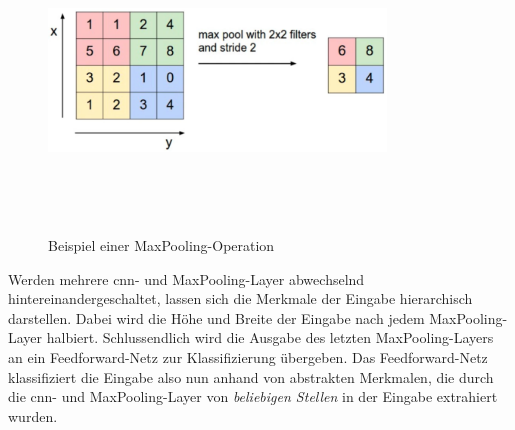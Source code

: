 \begin{figure}[h]
    \centering
    \includegraphics[width=0.8\textwidth,height=8cm,keepaspectratio=true]{content/images/MaxPooling.png}
    \caption{Beispiel einer MaxPooling-Operation \cite{6S191CNN}}
    \label{fig:MaxPooling}
\end{figure}

Werden mehrere \acrshort{cnn}- und MaxPooling-Layer abwechselnd hintereinandergeschaltet, lassen sich die Merkmale der Eingabe hierarchisch darstellen.
Dabei wird die Höhe und Breite der Eingabe nach jedem MaxPooling-Layer halbiert.
Schlussendlich wird die Ausgabe des letzten MaxPooling-Layers an ein Feedforward-Netz zur Klassifizierung übergeben.
Das Feedforward-Netz klassifiziert die Eingabe also nun anhand von abstrakten Merkmalen, die durch die \acrshort{cnn}- und MaxPooling-Layer von \emph{beliebigen Stellen} in der Eingabe extrahiert wurden.
